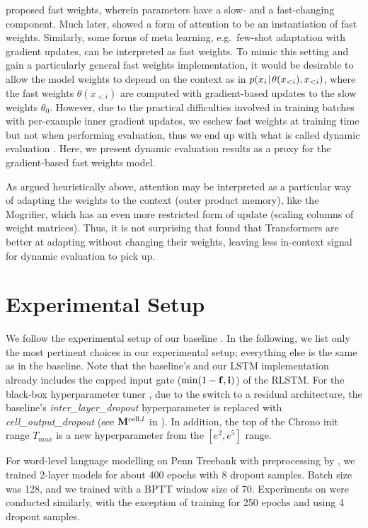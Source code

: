 \citet{hinton1987using} proposed fast weights, wherein parameters have a slow- and a fast-changing component.
Much later, \citet{ba2016using} showed a form of attention to be an instantiation of fast weights.
Similarly, some forms of meta learning, e.g.\ few-shot adaptation with gradient updates, can be interpreted as fast weights.
To mimic this setting and gain a particularly general fast weights implementation, it would be desirable to allow the model weights to depend on the context as in $p(x_i\hspace{0.08em}|\hspace{0.11em} \theta(x_{<i}),x_{<i})$, where the fast weights $\theta(x_{<i})$ are computed with gradient-based updates to the slow weights $\theta_0$.
However, due to the practical difficulties involved in training batches with per-example inner gradient updates, we eschew fast weights at training time but not when performing evaluation, thus we end up with what is called dynamic evaluation \citep{krause2017dynamic}.
Here, we present dynamic evaluation results as a proxy for the gradient-based fast weights model.

As argued heuristically above, attention may be interpreted as a particular way of adapting the weights to the context (outer product memory), like the Mogrifier, which has an even more restricted form of update (scaling columns of weight matrices).
Thus, it is not surprising that \citet{melis2019mogrifier} found that Transformers are better at adapting without changing their weights, leaving less in-context signal for dynamic evaluation to pick up.

\section{Experimental Setup}

We follow the experimental setup of our baseline \citep{melis2019mogrifier}.
In the following, we list only the most pertinent choices in our experimental setup; everything else is the same as in the baseline.
Note that the baseline's and our LSTM implementation already includes the capped input gate ($\min(1-\mathbf{f},\mathbf{i})$) of the RLSTM.
For the black-box hyperparameter tuner \citep{golovin2017google}, due to the switch to a residual architecture, the baseline's \emph{inter\_layer\_dropout} hyperparameter is replaced with \emph{cell\_output\_dropout} (see $\mathbf{M}^{\textrm{cell},l}$ in ).
In addition, the top of the Chrono init range $T_{\textit{max}}$ is a new hyperparameter from the $[e^2,e^5]$ range.

For word-level language modelling on Penn Treebank \citep{marcus1993building} with preprocessing by \citep{mikolov2010recurrent}, we trained 2-layer models for about 400 epochs with 8 dropout samples.
Batch size was 128, and we trained with a BPTT \citep{werbos1990backpropagation} window size of 70.
Experiments on \wikitexttwo \citep{DBLP:journals/corr/MerityXBS16} were conducted similarly, with the exception of training for 250 epochs and using 4 dropout samples.

